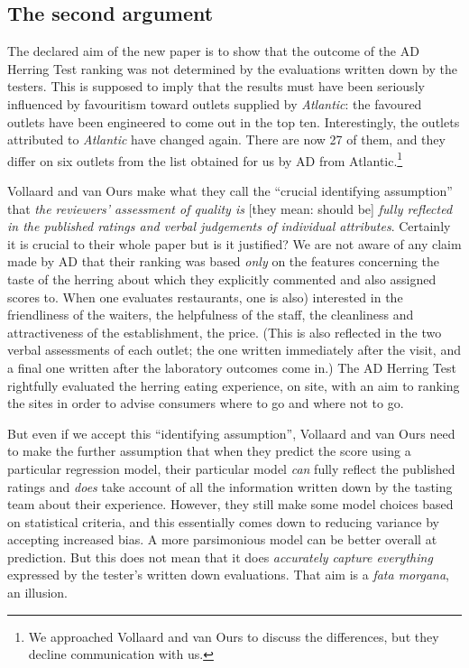 \documentclass[alpha-refs]{wiley-article}
\begin{document}
\subsection{The second argument}

The declared aim of the new paper  \citet{vollaard2021bias} is to show that the outcome of the AD Herring Test ranking was not determined by the evaluations written down by the testers. This is supposed to imply that the results must have been seriously influenced by favouritism toward outlets supplied by \emph{Atlantic}: the favoured outlets have been engineered to come out in the top ten. Interestingly, the outlets attributed to \emph{Atlantic} have changed again. There are now 27 of them, and they differ on six outlets from the list obtained for us by AD from Atlantic.\footnote{We approached Vollaard and van Ours to discuss the differences, but they decline communication with us.}

Vollaard and van Ours make what they call the ``crucial identifying assumption'' that \emph{the reviewers’ assessment of quality is} [they mean: should be] \emph{fully reflected in the published ratings and verbal judgements of individual attributes}. Certainly it is crucial to their whole paper but is it justified?
We are not aware of any claim made by AD that their ranking was based \emph{only} on the features concerning the taste of the herring about which they explicitly commented and also assigned scores to. When one evaluates restaurants, one is also) interested in the friendliness of the waiters, the helpfulness of the staff, the cleanliness and attractiveness of the establishment, the price. (This is also reflected in the two verbal assessments of each outlet; the one written immediately after the visit, and a final one written after the laboratory outcomes come in.)  The AD Herring Test rightfully evaluated the herring eating experience, on site, with an aim to ranking the sites in order to advise consumers where to go and where not to go. 

But even if we accept this ``identifying assumption'', Vollaard and van Ours need to make the further assumption that when they predict the score using a particular regression model, their particular model \emph{can} fully reflect the published ratings and \emph{does} take account of all the information written down by the tasting team about their experience. However, they still make some model choices based on statistical criteria, and this essentially comes down to reducing variance by accepting increased bias. A more parsimonious model can be better overall at prediction.  But this does not mean that it does \emph{accurately capture everything} expressed by the tester's written down evaluations. That aim is a \emph{fata morgana}, an illusion.
\end{document}

